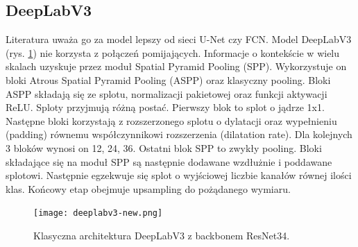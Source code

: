 \subsection{DeepLabV3}
Literatura uważa go za model lepszy od sieci U-Net czy FCN. Model DeepLabV3 (rys. \ref{fig:deeplabv3}) nie korzysta z połączeń pomijających. Informacje o kontekście w wielu skalach uzyskuje przez moduł Spatial Pyramid Pooling (SPP). Wykorzystuje on bloki Atrous Spatial Pyramid Pooling (ASPP) oraz klasyczny pooling. Bloki ASPP składają się ze splotu, normalizacji pakietowej oraz funkcji aktywacji ReLU. Sploty przyjmują różną postać. Pierwszy blok to splot o jądrze 1x1. Następne bloki korzystają z rozszerzonego splotu o dylatacji oraz wypełnieniu (padding) równemu współczynnikowi rozszerzenia (dilatation rate). Dla kolejnych 3 bloków wynosi on 12, 24, 36. Ostatni blok SPP to zwykły pooling. Bloki składające się na moduł SPP są następnie dodawane wzdłużnie i poddawane splotowi. Następnie egzekwuje się splot o wyjściowej liczbie kanałów równej ilości klas. Końcowy etap obejmuje upsampling do pożądanego wymiaru.
\begin{figure}[ht!]
\texttt{[image: deeplabv3-new.png]}
\caption{Klasyczna architektura DeepLabV3 z backbonem ResNet34.}
\label{fig:deeplabv3}
\end{figure}



